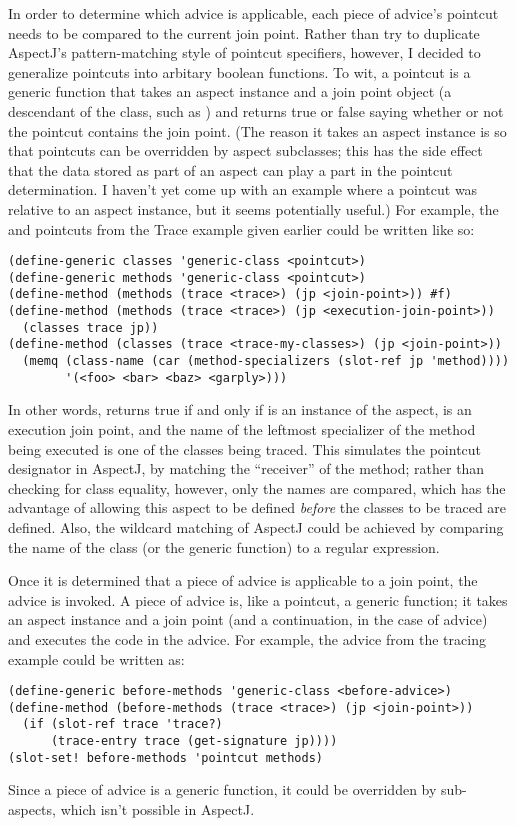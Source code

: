 \documentclass[12pt]{article}
\begin{document}
In order to determine which advice is applicable, each piece of
advice's pointcut needs to be compared to the current join point.
Rather than try to duplicate AspectJ's pattern-matching style of
pointcut specifiers, however, I decided to generalize pointcuts into
arbitary boolean functions.  To wit, a pointcut is a generic function
that takes an aspect instance and a join point object (a descendant of
the  class, such as ) and
returns true or false saying whether or not the pointcut contains the
join point.  (The reason it takes an aspect instance is so that
pointcuts can be overridden by aspect subclasses; this has the side
effect that the data stored as part of an aspect can play a part in
the pointcut determination.  I haven't yet come up with an example where
a pointcut was relative to an aspect instance, but it seems
potentially useful.)  For example, the  and
 pointcuts from the Trace example given earlier could
be written like so:
\begin{verbatim}
(define-generic classes 'generic-class <pointcut>)
(define-generic methods 'generic-class <pointcut>)
(define-method (methods (trace <trace>) (jp <join-point>)) #f)
(define-method (methods (trace <trace>) (jp <execution-join-point>))
  (classes trace jp))
(define-method (classes (trace <trace-my-classes>) (jp <join-point>))
  (memq (class-name (car (method-specializers (slot-ref jp 'method))))
        '(<foo> <bar> <baz> <garply>)))
\end{verbatim}
In other words,  returns true if and only if
 is an instance of the  aspect,
 is an execution join point, and the name of the leftmost
specializer of the method being executed is one of the classes being
traced.  This simulates the  pointcut designator in
AspectJ, by matching the ``receiver'' of the method; rather than
checking for class equality, however, only the names are compared,
which has the advantage of allowing this aspect to be defined
\emph{before} the classes to be traced are defined.  Also, the wildcard
matching of AspectJ could be achieved by comparing the name of the
class (or the generic function) to a regular expression.

Once it is determined that a piece of advice is applicable to a join
point, the advice is invoked.  A piece of advice is, like a pointcut,
a generic function; it takes an aspect instance and a join point (and
a continuation, in the case of  advice) and executes the
code in the advice.  For example, the  advice from the
tracing example could be written as:
\begin{verbatim}
(define-generic before-methods 'generic-class <before-advice>)
(define-method (before-methods (trace <trace>) (jp <join-point>))
  (if (slot-ref trace 'trace?)
      (trace-entry trace (get-signature jp))))
(slot-set! before-methods 'pointcut methods)
\end{verbatim}
Since a piece of advice is a generic function, it could be overridden
by sub-aspects, which isn't possible in AspectJ.
\end{document}
